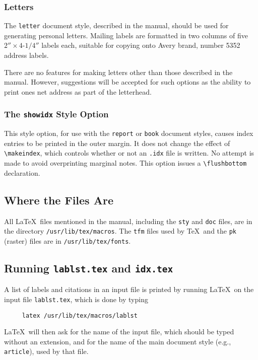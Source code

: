 \subsubsection{Letters} \label{sec:letters}

The \mbox{\tt letter} document style, described in the manual, should
be used for generating personal letters.
Mailing labels are formatted in two columns of five
$2''\times\mbox{4-1/4}''$ labels each, suitable for copying onto Avery
brand, number 5352 address labels.

There are no features for making letters other than those described in
the manual.  However, suggestions will be accepted for such options as
the ability to print ones net address as part of the letterhead.

\subsubsection{The {\tt showidx} Style Option}

This style option, for use with the {\tt report} or {\tt book} document
styles, causes index entries to be printed in the outer margin.  It
does not change the effect of \verb|\makeindex|, which controls
whether or not an {\tt .idx} file is written.  No attempt is made to
avoid overprinting marginal notes.  This option issues a
\verb|\flushbottom| declaration.

\subsection{Where the Files Are}

%

All \LaTeX\ files mentioned in the manual, including the {\tt sty} and
{\tt doc} files, are in the directory \mbox{\tt /usr/lib/tex/macros}.
The {\tt tfm} files used by \TeX\ and the {\tt pk} (raster) files
are in \mbox{\tt /usr/lib/tex/fonts}.

\subsection{Running {\tt lablst.tex} and {\tt idx.tex}}

A list of labels and citations in an input file is printed
by running \LaTeX\ on the input file \mbox{\tt lablst.tex},
which is done by typing
\begin{verbatim}
     latex /usr/lib/tex/macros/lablst
\end{verbatim}
\LaTeX\ will then ask for the name of the input file, which should be
typed without an extension, and for the name of the main document style
(e.g., \mbox{\tt article}), used by that file.

